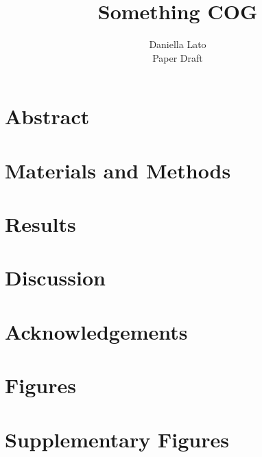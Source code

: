 \documentclass[11pt]{article}
\title{\sc Something COG}
\author{\sc Daniella Lato \\ \sc Paper Draft}
\newcommand{\beginsupplement}{%
	\setcounter{table}{0}
	\renewcommand{\thetable}{S\arabic{table}}%
	\setcounter{figure}{0}
	\renewcommand{\thefigure}{S\arabic{figure}}%
}
\begin{document}
	\thispagestyle{empty}
	\maketitle
	\thispagestyle{empty}	
	\newpage
	\doublespacing
	
	\section{Abstract}

	\section{Materials and Methods}
	
	\section{Results}
	
	\section{Discussion}

\section{Acknowledgements}	

	\newpage
	
	
	
	
	\newpage
	
	\section{Figures}
\newpage
	\section{Supplementary Figures}
	\beginsupplement
\end{document}
